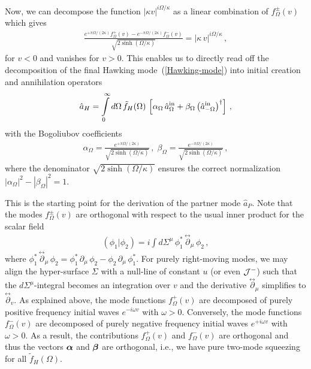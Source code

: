 \documentclass[aps,prd,showpacs,amssymb,nofootinbib,twocolumn]{revtex4}
\newcommand{\inner}[2]{\left(#1|#2\right)}
\newcommand{\f}[1]{\mbox{\boldmath$#1$}}
\newcommand{\bea}{\begin{eqnarray}}
\newcommand{\ea}{\end{eqnarray}}
\begin{document}
Now, we can decompose the function $|\kappa v|^{i\Omega/\kappa}$ 
as a linear combination of $f^\pm_\Omega(v)$ which gives 
%
\bea
\frac{e^{+\pi\Omega/(2\kappa)} f^+_\Omega(v) -  
e^{-\pi\Omega/(2\kappa)}  f^-_\Omega(v)}
{\sqrt{2\sinh(\Omega/\kappa)}}
=
\left|\kappa\,v\right|^{i\Omega/\kappa} 
\,,
\ea
%
for $v<0$ and vanishes for $v>0$.
%
This enables us to directly read off the decomposition of the final Hawking 
mode~(\ref{Hawking-mode}) into initial creation and annihilation operators 
%
\bea
\hat a_H=\int\limits_0^\infty d\Omega\,\tilde f_H(\Omega)\,
\left[
\alpha_\Omega\,\hat a_\Omega^{\rm in}
+
\beta_\Omega\left(\hat a_{-\Omega}^{\rm in}\right)^\dagger
\right]
\,,
\ea
%
with the Bogoliubov coefficients 
%
\bea
\alpha_\Omega=\frac{e^{+\pi\Omega/(2\kappa)}}{\sqrt{2\sinh(\Omega/\kappa)}}
\,,\;
\beta_\Omega=\frac{e^{-\pi\Omega/(2\kappa)}}{\sqrt{2\sinh(\Omega/\kappa)}}
\,,
\ea
%
where the denominator $\sqrt{2\sinh(\Omega/\kappa)}$ ensures the correct 
normalization $|\alpha_\Omega|^2-|\beta_\Omega|^2=1$.

This is the starting point for the derivation of the partner mode $\hat a_P$.
%
Note that the modes $f^\pm_\Omega(v)$ are orthogonal with respect to 
the usual inner product for the scalar field 
%
\bea
\label{inner}
\inner{\phi_1}{\phi_2}
=
i\int d\Sigma^\mu\,
\phi_1^*\,\stackrel{\leftrightarrow}{\partial}_\mu\,\phi_2
\,,
\ea
%
where $\phi_1^*\,\stackrel{\leftrightarrow}{\partial}_\mu\,\phi_2=
\phi_1^*\,\partial_\mu\,\phi_2-\phi_2\,\partial_\mu\,\phi_1^*$. 
%
For purely right-moving modes, we may align the hyper-surface $\Sigma$ 
with a null-line of constant $u$ (or even ${\cal J}^-$) such that 
the $d\Sigma^\mu$-integral becomes an integration over $v$ and the 
derivative $\stackrel{\leftrightarrow}{\partial}_\mu$ simplifies to 
$\stackrel{\leftrightarrow}{\partial}_v$.
%
As explained above, the mode functions $f^+_\Omega(v)$ are decomposed of 
purely positive frequency initial waves $e^{-i\omega v}$ with $\omega>0$.
%
Conversely, the mode functions $f^-_\Omega(v)$ are decomposed of 
purely negative frequency initial waves $e^{+i\omega v}$ with $\omega>0$.
%
As a result,  the contributions $f^+_\Omega(v)$ and $f^-_\Omega(v)$ 
are orthogonal and thus the vectors $\f{\alpha}$ and $\f{\beta}$ are orthogonal,
i.e., we have pure two-mode squeezing for all $\tilde f_H(\Omega)$.
\end{document}

